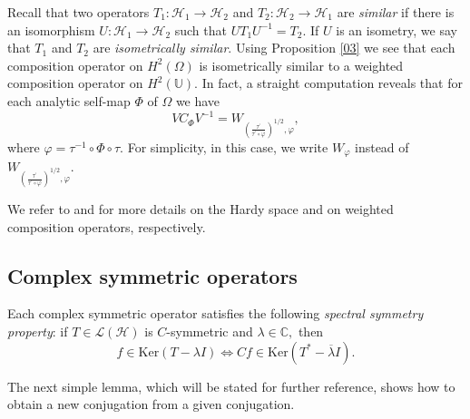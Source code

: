 \documentclass[11pt]{amsart}%
\theoremstyle{definition}
\theoremstyle{remark}
\numberwithin{equation}{section}
\begin{document}
Recall that two operators $T_{1}:\mathcal{H}_{1}\longrightarrow\mathcal{H}%
_{2}$ and $T_{2}:\mathcal{H}_{2}\longrightarrow\mathcal{H}_{1}$ are
\textit{similar} if there is an isomorphism $U:\mathcal{H}_{1}\longrightarrow
\mathcal{H}_{2}$ such that $UT_{1}U^{-1}=T_{2}.$ If $U$ is an isometry, we say
that $T_{1}$ and $T_{2}$ are \textit{isometrically similar}. Using Proposition
\ref{03} we see that each composition operator on $H^{2}(\Omega)$ is
isometrically similar to a weighted composition operator on $H^{2}%
(\mathbb{U}).$
In fact, a straight computation reveals that for each analytic self-map $\Phi$
of $\Omega$ we have
\[
VC_{\Phi}V^{-1}=W_{\left(  \frac{\tau^{\prime}}{\tau^{\prime}\circ\varphi
}\right)  ^{1/2},\varphi},
\]
where $\varphi=\tau^{-1}\circ\Phi\circ\tau.$ For simplicity, in this case, we
write $W_{\varphi}$ instead of $W_{\left(  \frac{\tau^{\prime}}{\tau^{\prime
}\circ\varphi}\right)  ^{1/2},\varphi}.$

We refer to \cite{Cowen-MacClauer, Duren, Avendano-Rosenthal,Joel Shapiro} and
\cite{Paul2, Shapiro-Smith} for more details on the Hardy space and on weighted composition operators, respectively.

\subsection{Complex symmetric operators}

Each complex symmetric operator satisfies the following \textit{spectral
symmetry property}: if $T\in\mathcal{L}(\mathcal{H})$ is $C$-symmetric and
$\lambda\in\mathbb{C},$ then
\[
f\in\mathrm{Ker}(T-\lambda I)\iff Cf\in\mathrm{Ker}(T^{\ast}-\overline
{\lambda}I).
\]


The next simple lemma, which will be stated for further reference, shows how
to obtain a new conjugation from a given conjugation.
\end{document}
